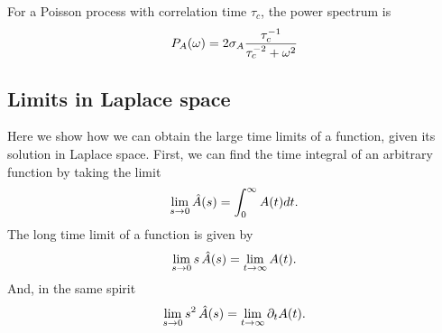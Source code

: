 For a Poisson process with correlation time $\tau_c$, the power spectrum is
\begin{equation}
 P_A(\omega) = 2 \sigma_A \frac{\tau_c^{-1}}{\tau_c^{-2} + \omega^2}
 \elabel{PoissonPow}
\end{equation}


\subsection{ Limits in Laplace space}
Here we show how we can obtain the large time limits of a function, given its solution in Laplace space. First, we can find the time integral of an arbitrary function by taking the limit
\begin{align}
\lim_{s \to 0} \hat{A}(s) = \int_0^\infty A(t) dt.
\elabel{si:int_vs_lap}
\end{align}
The long time limit of a function is given by
\begin{align}
\lim_{s \to 0} s \, \hat{A}(s) = \lim_{t \to \infty} A(t).
\elabel{si:longt_in_lap}
\end{align}
And, in the same spirit
\begin{align}
\lim_{s \to 0} s^2 \, \hat{A}(s) = \lim_{t \to \infty} \partial_t A(t).
\elabel{si:longt_in_lap2}
\end{align}


